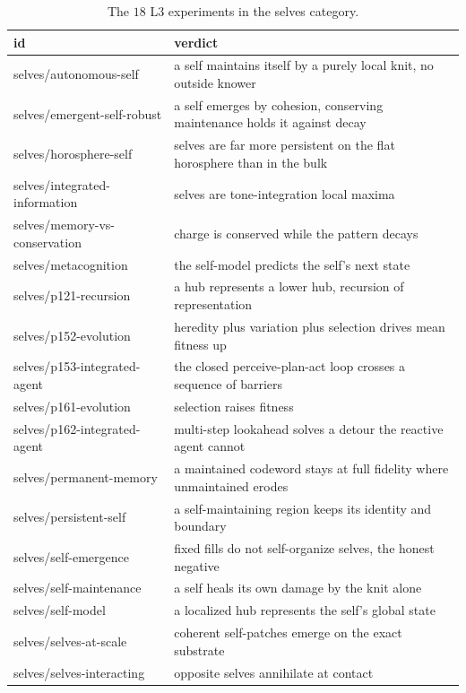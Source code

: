 \begin{table}[ht]
\centering
\begin{tabular}{@{}ll@{}}
\toprule
id & verdict \\
\midrule
selves/autonomous-self & a self maintains itself by a purely local knit, no outside knower \\
selves/emergent-self-robust & a self emerges by cohesion, conserving maintenance holds it against decay \\
selves/horosphere-self & selves are far more persistent on the flat horosphere than in the bulk \\
selves/integrated-information & selves are tone-integration local maxima \\
selves/memory-vs-conservation & charge is conserved while the pattern decays \\
selves/metacognition & the self-model predicts the self's next state \\
selves/p121-recursion & a hub represents a lower hub, recursion of representation \\
selves/p152-evolution & heredity plus variation plus selection drives mean fitness up \\
selves/p153-integrated-agent & the closed perceive-plan-act loop crosses a sequence of barriers \\
selves/p161-evolution & selection raises fitness \\
selves/p162-integrated-agent & multi-step lookahead solves a detour the reactive agent cannot \\
selves/permanent-memory & a maintained codeword stays at full fidelity where unmaintained erodes \\
selves/persistent-self & a self-maintaining region keeps its identity and boundary \\
selves/self-emergence & fixed fills do not self-organize selves, the honest negative \\
selves/self-maintenance & a self heals its own damage by the knit alone \\
selves/self-model & a localized hub represents the self's global state \\
selves/selves-at-scale & coherent self-patches emerge on the exact substrate \\
selves/selves-interacting & opposite selves annihilate at contact \\
\bottomrule
\end{tabular}
\caption{The $18$ L3 experiments in the selves category.}
\label{tab:l3-selves}
\end{table}

